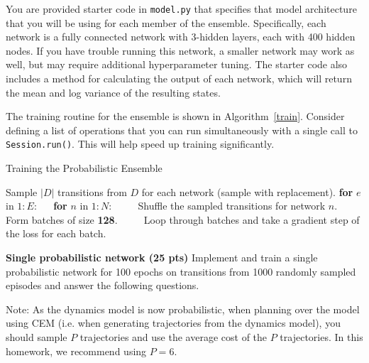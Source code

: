 \documentclass[12pt]{article}
\begin{document}
You are provided starter code in \texttt{model.py} that specifies that model architecture that you will be using for each member of the ensemble.  Specifically, each network is a fully connected network with 3-hidden layers, each with 400 hidden nodes.  If you have trouble running this network, a smaller network may work as well, but may require additional hyperparameter tuning.  The starter code also includes a method for calculating the output of each network, which will return the mean and log variance of the resulting states.  

The training routine for the ensemble is shown in Algorithm~\ref{train}. Consider defining a list of operations that you can run simultaneously with a single call to \texttt{Session.run()}.  This will help speed up training significantly.
\begin{algorithm}
\label{alga2c}
\caption{Training the Probabilistic Ensemble}\label{train}
\begin{algorithmic}[1]
\State Sample $|D|$ transitions from $D$ for each network (sample with replacement).
\State \textbf{for} $e$ in $1:E$:
\State $\quad$ \textbf{for} $n$ in $1:N$: 
\State $\quad\quad$ Shuffle the sampled transitions for network $n$.
\State $\quad\quad$ Form batches of size \textbf{128}.
\State $\quad\quad$ Loop through batches and take a gradient step of the loss for each batch.
\EndProcedure
\end{algorithmic}
\end{algorithm}

\textbf{Single probabilistic network (25 pts)}
Implement and train a single probabilistic network for 100 epochs on transitions from 1000 randomly sampled episodes and answer the following questions.

Note: As the dynamics model is now probabilistic, when planning over the model using CEM (i.e. when generating trajectories from the dynamics model), you should sample $P$ trajectories and use the average cost of the $P$ trajectories. In this homework, we recommend using $P=6$.
\end{document}
